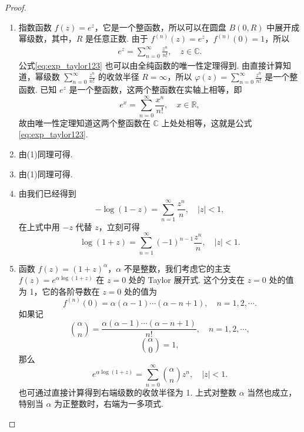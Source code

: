 \documentclass[../../main.tex]{subfiles}
\begin{document}
\begin{proof}
\begin{enumerate}[(1)]
\item 指数函数 \( f(z) = e^z \)，它是一个整函数，所以可以在圆盘 \( B(0,R) \) 中展开成幂级数，其中，\( R \) 是任意正数. 由于 \( f^{(n)}(z) = e^z \)，\( f^{(n)}(0) = 1 \)，所以
\begin{align}
e^z = \sum_{n=0}^{\infty} \frac{z^n}{n!}, \quad z \in \mathbb{C}. \label{eq:exp_taylor123}
\end{align}
公式\eqref{eq:exp_taylor123} 也可以由全纯函数的唯一性定理得到. 由直接计算知道，幂级数 \( \sum_{n=0}^{\infty} \frac{z^n}{n!} \) 的收敛半径 \( R = \infty \)，所以 \( \varphi(z) = \sum_{n=0}^{\infty} \frac{z^n}{n!} \) 是一个整函数. 已知 \( e^z \) 是一个整函数，这两个整函数在实轴上相等，即
\[
e^x = \sum_{n=0}^{\infty} \frac{x^n}{n!}, \quad x \in \mathbb{R},
\]
故由唯一性定理知道这两个整函数在 \( \mathbb{C} \) 上处处相等，这就是公式 \eqref{eq:exp_taylor123}.

\item 由(1)同理可得.

\item 由(1)同理可得.

\item 由我们已经得到
\[
- \log(1 - z) = \sum_{n=1}^{\infty} \frac{z^n}{n}, \quad |z| < 1,
\]
在上式中用 \( -z \) 代替 \( z \)，立刻可得
\[
\log(1 + z) = \sum_{n=1}^{\infty} (-1)^{n - 1} \frac{z^n}{n}, \quad |z| < 1.
\]

\item 函数 \( f(z) = (1 + z)^{\alpha} \)，\( \alpha \) 不是整数，我们考虑它的主支 \( f(z) = e^{\alpha \log(1 + z)} \) 在 \( z = 0 \) 处的 Taylor 展开式. 这个分支在 \( z = 0 \) 处的值为 1，它的各阶导数在 \( z = 0 \) 处的值为
\[
f^{(n)}(0) = \alpha(\alpha - 1) \cdots (\alpha - n + 1), \quad n = 1, 2, \cdots.
\]
如果记
\[
\binom{\alpha}{n} = \frac{\alpha(\alpha - 1) \cdots (\alpha - n + 1)}{n!}, \quad n = 1, 2, \cdots,
\]
\[
\binom{\alpha}{0} = 1,
\]
那么
\[
e^{\alpha \log(1 + z)} = \sum_{n=0}^{\infty} \binom{\alpha}{n} z^n, \quad |z| < 1.
\]
也可通过直接计算得到右端级数的收敛半径为 1. 上式对整数 \( \alpha \) 当然也成立，特别当 \( \alpha \) 为正整数时，右端为一多项式.
\end{enumerate}

\end{proof}
\end{document}
